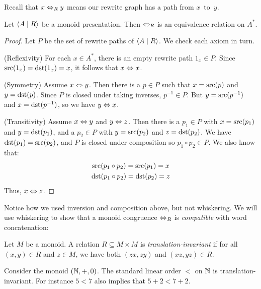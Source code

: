 \documentclass[../generics]{subfiles}
\begin{document}
Recall that $x\Leftrightarrow_R y$ means our rewrite graph has a path from $x$~to~$y$.

\begin{proposition}
Let $\langle A \mid R\rangle$ be a monoid presentation. Then $\Leftrightarrow_R$ is an equivalence relation on $A^*$.
\end{proposition}
\begin{proof}
Let $P$ be the set of rewrite paths of $\langle A \mid R\rangle$. We check each axiom in turn.

\smallskip

(Reflexivity) For each $x\in A^*$, there is an empty rewrite path $1_x\in P$. Since $\operatorname{src}(1_x)=\operatorname{dst}(1_x)=x$, it follows that $x\Leftrightarrow x$.

\smallskip

(Symmetry) Assume $x\Leftrightarrow y$. Then there is a $p\in P$ such that $x=\operatorname{src}(p)$ and $y=\operatorname{dst}(p)$. Since $P$ is closed under taking inverses, $p^{-1}\in P$. But $y=\operatorname{src}(p^{-1})$ and $x=\operatorname{dst}(p^{-1})$, so we have $y\Leftrightarrow x$.

\smallskip

(Transitivity) Assume $x\Leftrightarrow y$ and $y\Leftrightarrow z$. Then there is a $p_1\in P$ with $x=\operatorname{src}(p_1)$ and $y=\operatorname{dst}(p_1)$, and a $p_2\in P$ with $y=\operatorname{src}(p_2)$ and $z=\operatorname{dst}(p_2)$. We have $\operatorname{dst}(p_1)=\operatorname{src}(p_2)$, and $P$ is closed under composition so $p_1\circ p_2 \in P$. We also know that:
\begin{gather*}
\operatorname{src}(p_1\circ p_2)=\operatorname{src}(p_1)=x\\
\operatorname{dst}(p_1\circ p_2)=\operatorname{dst}(p_2)=z
\end{gather*}
Thus, $x\Leftrightarrow z$.
\end{proof}

Notice how we used inversion and composition above, but not whiskering. We will use whiskering to show that a monoid congruence $\Leftrightarrow_R$ is \emph{compatible} with word concatenation:

\begin{definition}\label{translation invariant def}
Let $M$ be a monoid. A relation $R\subseteq M\times M$ is \emph{translation-invariant} if for all $(x,y)\in R$ and $z\in M$, we have both $(zx,zy)$ and $(xz,yz)\in R$.
\end{definition}

\begin{example}
Consider the monoid $(\mathbb{N},+,0)$. The standard linear order $<$ on $\mathbb{N}$ is translation-invariant. For instance $5<7$ also implies that $5+2<7+2$.
\end{example}
\end{document}
